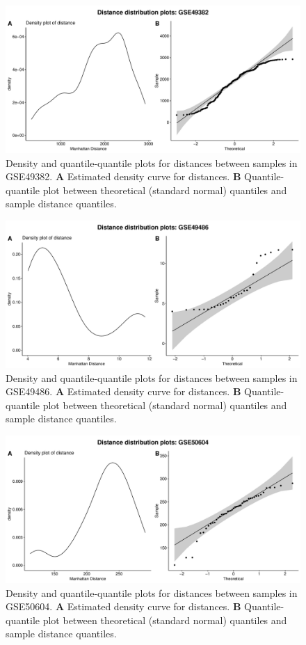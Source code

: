 \documentclass[10pt,letterpaper]{article}\usepackage[]{graphicx}\usepackage[]{color}
\begin{document}
\begin{figure}[H]
	\includegraphics[width=\textwidth]{manhattan-distance_hist_GSE49382.pdf}
	\caption{Density and quantile-quantile plots for distances between samples in GSE49382. \textbf{A} Estimated density curve for distances. \textbf{B} Quantile-quantile plot between theoretical (standard normal) quantiles and sample distance quantiles.}
\end{figure}

\begin{figure}[H]
	\includegraphics[width=\textwidth]{manhattan-distance_hist_GSE49486.pdf}
	\caption{Density and quantile-quantile plots for distances between samples in GSE49486. \textbf{A} Estimated density curve for distances. \textbf{B} Quantile-quantile plot between theoretical (standard normal) quantiles and sample distance quantiles.}
\end{figure}

\begin{figure}[H]
	\includegraphics[width=\textwidth]{manhattan-distance_hist_GSE50604.pdf}
	\caption{Density and quantile-quantile plots for distances between samples in GSE50604. \textbf{A} Estimated density curve for distances. \textbf{B} Quantile-quantile plot between theoretical (standard normal) quantiles and sample distance quantiles.}
\end{figure}
\end{document}
